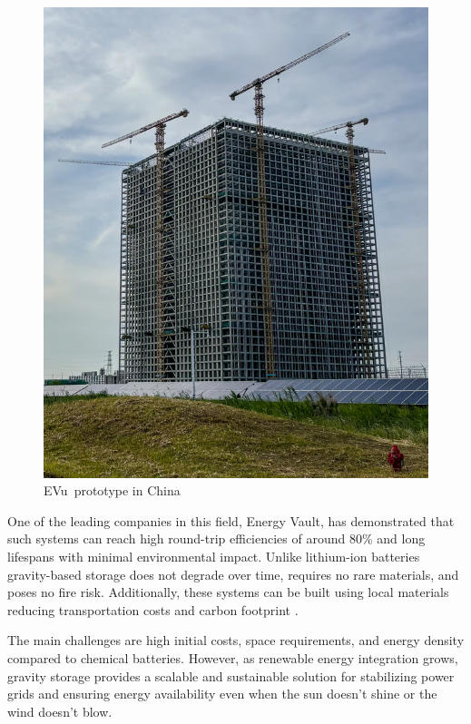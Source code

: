 \documentclass{article}
\begin{document}
\vspace*{-1.5cm}

\begin{figure}
    \vspace*{-5cm}
    \includegraphics[width=.4\textwidth]{media/EVx.png}
    \caption{EVu\texttrademark\ prototype in China}
\end{figure}

\vspace*{-0.3cm}
One of the leading companies in this field, Energy Vault, has
demonstrated that such systems can reach high round-trip efficiencies
of around 80\% and long lifespans with minimal environmental impact.
Unlike lithium-ion batteries gravity-based storage does not degrade
over time, requires no rare materials, and poses no fire risk.
Additionally, these systems can be built using local materials
reducing transportation costs and carbon footprint
\parencite{mombelli2020}.
\wrapfill

\vspace*{-1cm}
The main challenges are high initial costs, space requirements,
and energy density compared to chemical batteries. However, as
renewable energy integration grows, gravity storage provides a
scalable and sustainable solution for stabilizing power grids and
ensuring energy availability even when the sun doesn’t shine or the
wind doesn’t blow.

\newpage
\restoregeometry
\end{document}

